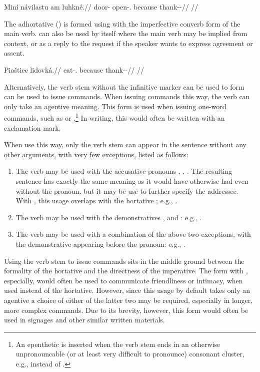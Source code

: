\pex
\begingl
\gla Miní návilastu am luhkné.//
\glb door-\Gen{} open-\Cv{}.\Pf{} because thank-\Pv{}-\Hort{}//
\glft {}//
\endgl
\xe

The adhortative () is formed using  with the
imperfective converb form of the main verb.  can also be used by
itself where the main verb may be implied from context, or as a reply to the
request if the speaker wants to express agreement or assent.

\pex
\begingl
\gla Piaštiec lidovká.//
\glb eat-\Cv{}.\Ipf{} because thank-\Pv{}-\Hort{}//
\glft {}//
\endgl
\xe

Alternatively, the verb stem without the infinitive marker
 can be used to form can be used to issue commands. When issuing
commands this way, the verb can only take an agentive meaning. This form is used
when issuing one-word commands, such as  or
.\footnote{An epenthetic  is inserted when the verb
stem ends in an otherwise unpronouncable (or at least very difficult to
pronounce) consonant cluster, e.g.,  instead of
.} In writing, this would often be written with an
exclamation mark.

When use this way, only the verb stem can appear in the sentence without any
other arguments, with very few exceptions, listed as follows:
\begin{enumerate}
	\item The verb may be used with the accusative pronouns , , . The resulting sentence
	has exactly the same meaning as it would have otherwise had even without the
	pronoun, but it may be use to further specify the addressee. With ,
	this usage overlaps with the hortative ; e.g., .
	\item The verb may be used with the demonstratives ,
	 and : e.g.,
	.
	\item The verb may be used with a combination of the above two exceptions,
	with the demonstrative appearing before the pronoun: e.g., .
\end{enumerate}

Using the verb stem to issue commands sits in the middle ground between the
formality of the hortative and the directness of the imperative. The form with
, especially, would often be used to communicate friendliness or
intimacy, when used instead of the hortative. However, since this usage by
default takes only an agentive a choice of either of the latter two may be
required, especially in longer, more complex commands. Due to its brevity,
however, this form would often be used in signages and other similar written
materials.

